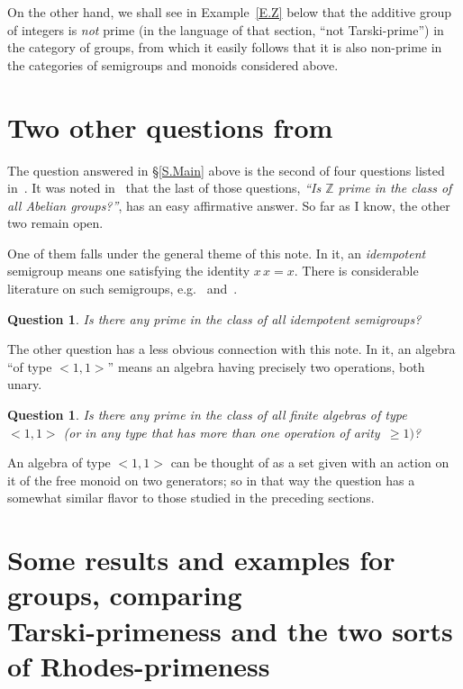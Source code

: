 \documentclass{amsart}
\newtheorem{question}[theorem]{Question}
\numberwithin{equation}{section}
\numberwithin{theorem}{section}
\newcommand{\Z}{\mathbb{Z}}
\begin{document}
On the other hand, we shall see in Example~\ref{E.Z} below
that the additive group of
integers is {\em not} prime (in the language of that
section, ``not Tarski-prime'') in the category of groups, from
which it easily follows that it is also non-prime in
the categories of semigroups and monoids considered above.

\section{Two other questions from~\cite{MMT}}\label{S.more_MMT_Qs}

The question answered in \S\ref{S.Main} above is the second
of four questions listed
in~\cite[middle of p.\,263]{MMT}.
It was noted in~\cite{YCor} that the last of those questions,
{\it ``Is $\Z$ prime in the class of all Abelian groups?''}, has
an easy affirmative answer.
So far as I know, the other two remain open.

One of them falls under the general theme of this note.
In it, an {\em idempotent} semigroup means one
satisfying the identity $x\,x=x.$
There is considerable literature on such semigroups,
e.g.~\cite[\S4.4]{JH} and~\cite{JAG}.

\begin{question}\label{Q.idpt}
\cite[p.\,263]{MMT}
Is there any prime in the class of all idempotent semigroups?
\end{question}

The other question has a less obvious connection with this note.
In it, an algebra ``of type $<\!1,1\!>$\!'' means
an algebra having precisely two operations, both unary.

\begin{question}\label{Q.<1,1>}
\cite[p.\,263]{MMT}
Is there any prime in the class of all finite algebras of type
$<\!1,1\!>$ {\rm(}or in any type that has more than one operation of
arity~$\geq 1)$?
\end{question}

An algebra of type $<\!1,1\!>$ can be thought of as a set given with
an action on it of the free monoid on two generators;
so in that way the question has a somewhat similar flavor to those
studied in the preceding sections.

\section{Some results and examples for groups, comparing \\
Tarski-primeness and the two sorts of Rhodes-primeness}\label{S.egg}
\end{document}
